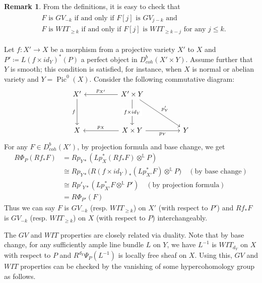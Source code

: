 \documentclass[11pt]{amsart}
\theoremstyle{definition}
\newtheorem{remark}[equation]{Remark}
\theoremstyle{plain}
\newcommand{\LL}{\mathbb L}
\DeclareMathOperator{\Pic}{Pic}
\begin{document}
\begin{remark} \label{GV and WIT with shift}
    From the definitions, it is easy to check that                   
\begin{align*}                    
    \begin{split}             
        &F \text{ is } GV_{-k} \text{ if and only if } F[j] \text{ is } GV_{j-k} \text{ and }\\                              
        &F \text{ is } WIT_{\ge k} \text{ if and only if } F[j] \text{ is } WIT_{\ge k-j} \text{ for any } j\le k.                         
    \end{split}           
\end{align*} 
\end{remark}
 

Let $f:X'\to X$ be a morphism from a projective variety $X'$ to $X$ and $P'\coloneqq L(f\times id_Y)^*(P)$ a perfect object in $D_{coh}^b(X'\times Y)$. Assume further that $Y$ is smooth; this condition is satisfied, for instance, when $X$ is normal or abelian variety and $Y= \Pic^0(X)$. Consider the following commutative diagram:
\[\begin{tikzcd}                           
	{X'} && {X'\times Y} \\
	\\
	X && {X\times Y} && Y
	\arrow["f"', from=1-1, to=3-1]
	\arrow["{p_{X'}}"', from=1-3, to=1-1]
	\arrow["{p_X}"', from=3-3, to=3-1]
	\arrow["{f\times id_Y}"{description}, from=1-3, to=3-3]
	\arrow["{p_Y}"', from=3-3, to=3-5]
	\arrow["{p_Y'}", from=1-3, to=3-5]
\end{tikzcd}\]
For any $F\in D_{coh}^b(X')$, by projection formula and base change, we get 
\begin{align*}
    R\Phi_P(Rf_* F) &= Rp_{Y*}(Lp_X^* (Rf_*F) \otimes^\LL P) \\
    &\cong Rp_{Y*}\big (R(f\times id_Y)_* (Lp_{X'}^*F)\otimes^{\LL} P\big) \quad (\text{by base change}) \\
    &\cong Rp'_{Y*}(Lp_{X'}^* F \otimes^{\LL} P') \quad (\text{by projection formula}) \\
    &= R\Phi_{P'}(F)
\end{align*}
Thus we can say $F$ is $GV_{-k}$ (resp. $WIT_{\ge k}$) on $X'$ (with respect to $P'$) and $Rf_*F$ is $GV_{-k}$ (resp. $WIT_{\ge k}$) on $X$ (with respect to $P$) interchangeably.

\medskip

The $GV$ and $WIT$ properties are closely related via duality. Note that by base change, for any sufficiently ample line bundle $L$ on $Y$, we have $L^{-1}$ is $WIT_{d_Y}$ on $X$ with respect to $P$ and $R^{d_Y}\Psi_P(L^{-1})$ is locally free sheaf on $X$. Using this, $GV$ and $WIT$ properties can be checked by the vanishing of some hypercohomology group as follows.
\end{document}
